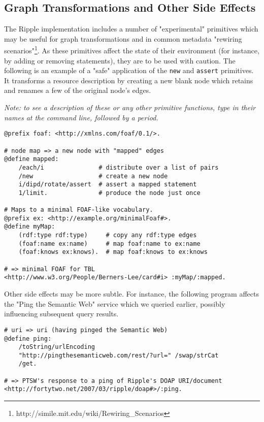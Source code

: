 \documentclass[runningheads]{llncs}
\begin{document}
\subsection{Graph Transformations and Other Side Effects}
The Ripple implementation includes a number of "experimental" primitives which may be useful for graph transformations and in common metadata "rewiring scenarios"\footnote{http://simile.mit.edu/wiki/Rewiring\_Scenarios}.  As these primitives affect the state of their environment (for instance, by adding or removing statements), they are to be used with caution.  The following is an example of a "safe" application of the \texttt{new} and \texttt{assert} primitives.  It transforms a resource description by creating a new blank node which retains and renames a few of the original node's edges.

\textit{Note: to see a description of these or any other primitive functions, type in their names at the command line, followed by a period.}
\begin{verbatim}
@prefix foaf: <http://xmlns.com/foaf/0.1/>.

# node map => a new node with "mapped" edges
@define mapped:
    /each/i               # distribute over a list of pairs
    /new                  # create a new node
    i/dipd/rotate/assert  # assert a mapped statement
    1/limit.              # produce the node just once

# Maps to a minimal FOAF-like vocabulary.
@prefix ex: <http://example.org/minimalFoaf#>.
@define myMap:
    (rdf:type rdf:type)     # copy any rdf:type edges
    (foaf:name ex:name)     # map foaf:name to ex:name
    (foaf:knows ex:knows).  # map foaf:knows to ex:knows

# => minimal FOAF for TBL
<http://www.w3.org/People/Berners-Lee/card#i> :myMap/:mapped.
\end{verbatim}

Other side effects may be more subtle.  For instance, the following program affects the "Ping the Semantic Web" service which we queried earlier, possibly influencing subsequent query results.
\begin{verbatim}
# uri => uri (having pinged the Semantic Web)
@define ping:
    /toString/urlEncoding
    "http://pingthesemanticweb.com/rest/?url=" /swap/strCat
    /get.

# => PTSW's response to a ping of Ripple's DOAP URI/document
<http://fortytwo.net/2007/03/ripple/doap#>/:ping.
\end{verbatim}
\end{document}
